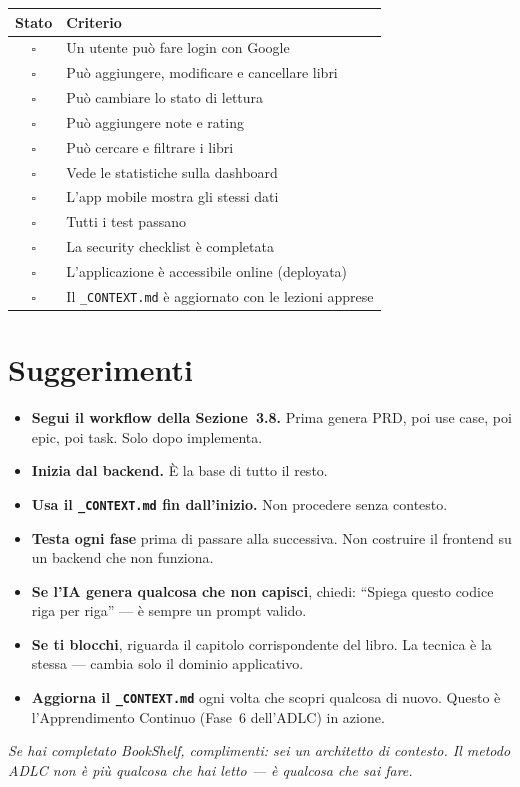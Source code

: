 \begin{center}
\begin{tabularx}{\textwidth}{c X}
\toprule
\textbf{Stato} & \textbf{Criterio} \\
\midrule
$\square$ & Un utente può fare login con Google \\
$\square$ & Può aggiungere, modificare e cancellare libri \\
$\square$ & Può cambiare lo stato di lettura \\
$\square$ & Può aggiungere note e rating \\
$\square$ & Può cercare e filtrare i libri \\
$\square$ & Vede le statistiche sulla dashboard \\
$\square$ & L'app mobile mostra gli stessi dati \\
$\square$ & Tutti i test passano \\
$\square$ & La security checklist è completata \\
$\square$ & L'applicazione è accessibile online (deployata) \\
$\square$ & Il \texttt{\_CONTEXT.md} è aggiornato con le lezioni apprese \\
\bottomrule
\end{tabularx}
\end{center}

\section{Suggerimenti}

\begin{itemize}
  \item \textbf{Segui il workflow della Sezione~3.8.} Prima genera PRD, poi use case, poi epic, poi task. Solo dopo implementa.
  \item \textbf{Inizia dal backend.} È la base di tutto il resto.
  \item \textbf{Usa il \texttt{\_CONTEXT.md} fin dall'inizio.} Non procedere senza contesto.
  \item \textbf{Testa ogni fase} prima di passare alla successiva. Non costruire il frontend su un backend che non funziona.
  \item \textbf{Se l'IA genera qualcosa che non capisci}, chiedi: ``Spiega questo codice riga per riga'' --- è sempre un prompt valido.
  \item \textbf{Se ti blocchi}, riguarda il capitolo corrispondente del libro. La tecnica è la stessa --- cambia solo il dominio applicativo.
  \item \textbf{Aggiorna il \texttt{\_CONTEXT.md}} ogni volta che scopri qualcosa di nuovo. Questo è l'Apprendimento Continuo (Fase~6 dell'ADLC) in azione.
\end{itemize}

\vfill

\begin{center}
\textit{Se hai completato BookShelf, complimenti: sei un architetto di contesto. Il metodo ADLC non è più qualcosa che hai letto --- è qualcosa che sai fare.}
\end{center}
